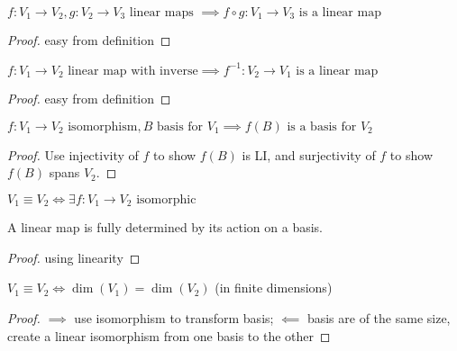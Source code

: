 \begin{property}
	$f:V_1 \to V_2, g:V_2 \to V_3 \text{ linear maps } \implies f \circ g:V_1 \to V_3 \text{ is a linear map}$
\end{property}
\begin{proof}
	easy from definition
\end{proof}
\begin{property}
	$f:V_1 \to V_2 \text{ linear map with inverse} \implies f^{-1}:V_2 \to V_1 \text{ is a linear map}$
\end{property}
\begin{proof}
	easy from definition
\end{proof}

\begin{property}
	$f:V_1 \to V_2 \text{ isomorphism}, B \text{ basis for } V_1 \implies f(B) \text{ is a basis for } V_2$ 
\end{property}
\begin{proof}
	Use injectivity of $f$ to show $f(B)$ is LI, and surjectivity of $f$ to show $f(B)$ spans $V_2$.
\end{proof}
\begin{notation}
	$V_1 \equiv V_2 \iff \exists f:V_1 \to V_2 \text{ isomorphic}$
\end{notation}
\begin{property}
	A linear map is fully determined by its action on a basis.
\end{property}
\begin{proof}
	using linearity
\end{proof}
\begin{property}
	$V_1 \equiv V_2 \iff \dim(V_1)=\dim(V_2)$ (in finite dimensions)
\end{property}
\begin{proof}
	$\implies$ use isomorphism to transform basis; $\impliedby$ basis are of the same size, create a linear isomorphism from one basis to the other
\end{proof}

